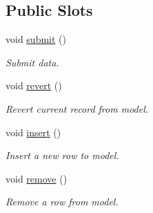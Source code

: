 \subsection*{Public Slots}
\begin{DoxyCompactItemize}
\item 
void \hyperlink{classmdt_abstract_sql_table_controller_a14f3e2a91fc30ca0e018944f4f95bc33}{submit} ()
\begin{DoxyCompactList}\small\item\em Submit data. \end{DoxyCompactList}\item 
void \hyperlink{classmdt_abstract_sql_table_controller_a36af2665b6d742aba3bc7f6ee6b2a6c4}{revert} ()
\begin{DoxyCompactList}\small\item\em Revert current record from model. \end{DoxyCompactList}\item 
void \hyperlink{classmdt_abstract_sql_table_controller_a82e88e4ff610f73b629bb6d2f229d1aa}{insert} ()
\begin{DoxyCompactList}\small\item\em Insert a new row to model. \end{DoxyCompactList}\item 
void \hyperlink{classmdt_abstract_sql_table_controller_a7bbe0f951403acbcc01c99f5916b9204}{remove} ()
\begin{DoxyCompactList}\small\item\em Remove a row from model. \end{DoxyCompactList}\end{DoxyCompactItemize}

